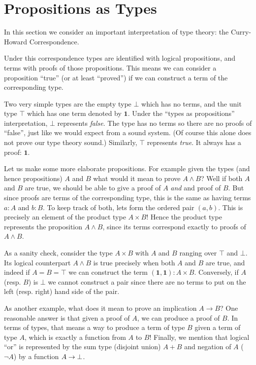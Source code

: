 \section{Propositions as Types}\label{sec:typesandprops}

In this section we consider an important interpretation of type theory: the
Curry-Howard Correspondence.

Under this correspondence types are identified with logical propositions, and
terms with proofs of those propositions. This means we can consider a
proposition ``true'' (or at least ``proved'') if we can construct a term of the
corresponding type.

Two very simple types are the empty type $\bot$ which has no terms, and the
unit type $\top$ which has one term denoted by $\mathbf{1}$.
Under the ``types as propositions'' interpretation, $\bot$ represents
\emph{false}. The type has no terms so there are no proofs of ``false'', just
like we would expect from a sound system. (Of course this alone does not prove
our type theory sound.) Similarly, $\top$ represents \emph{true}. It always has
a proof: $\mathbf{1}$.

Let us make some more elaborate propositions. For example given the types (and
hence propositions) $A$ and $B$ what would it mean to prove $A \land B$? Well if
both $A$ and $B$ are true, we should be able to give a proof of $A$ \emph{and}
and proof of $B$. But since proofs are terms of the corresponding type, this is
the same as having terms $a : A$ and $b : B$. To keep track of both, lets form
the ordered pair $(a, b)$. This is precisely an element of the product type $A
\times B$! Hence the product type represents the proposition $A \land B$, since
its terms correspond exactly to proofs of $A \land B$.

As a sanity check, consider the type $A \times B$ with $A$ and $B$
ranging over $\top$ and $\bot$. Its logical counterpart $A \land B$ is true
precisely when both $A$ and $B$ are true, and indeed if $A = B = \top$ we can
construct the term $(\mathbf{1}, \mathbf{1}) : A \times B$. Conversely, if
$A$ (resp. $B$) is $\bot$ we cannot construct a pair since there are no terms to put on the
left (resp. right) hand side of the pair.

As another example, what does it mean to prove an implication $A \rightarrow B$?
One reasonable answer is that given a proof of $A$, we can produce a proof of
$B$. In terms of types, that means a way to produce a term of type $B$ given a
term of type $A$, which is exactly a function from $A$ to $B$! Finally, we
mention that logical ``or'' is represented by the sum type (disjoint union) $A +
B$ and negation of $A$ ($\neg A$) by a function $ A \rightarrow \bot$.

